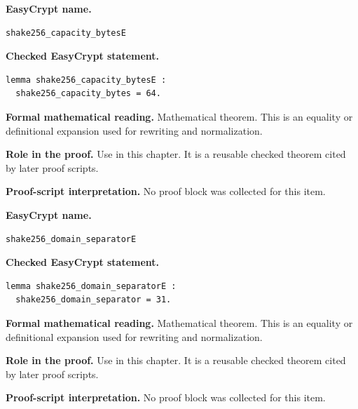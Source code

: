 \begin{formaltheorem}
\noindent\textbf{EasyCrypt name.}
\begin{lstlisting}[language=EasyCrypt,basicstyle=\ttfamily\scriptsize]
shake256_capacity_bytesE
\end{lstlisting}
\noindent\textbf{Checked EasyCrypt statement.}
\begin{lstlisting}[language=EasyCrypt,basicstyle=\ttfamily\scriptsize]
lemma shake256_capacity_bytesE :
  shake256_capacity_bytes = 64.
\end{lstlisting}
\noindent\textbf{Formal mathematical reading.}
Mathematical theorem. This is an equality or definitional expansion used for rewriting and normalization.

\noindent\textbf{Role in the proof.}
Use in this chapter. It is a reusable checked theorem cited by later proof scripts.

\noindent\textbf{Proof-script interpretation.}
No proof block was collected for this item.

\end{formaltheorem}

\begin{formaltheorem}
\noindent\textbf{EasyCrypt name.}
\begin{lstlisting}[language=EasyCrypt,basicstyle=\ttfamily\scriptsize]
shake256_domain_separatorE
\end{lstlisting}
\noindent\textbf{Checked EasyCrypt statement.}
\begin{lstlisting}[language=EasyCrypt,basicstyle=\ttfamily\scriptsize]
lemma shake256_domain_separatorE :
  shake256_domain_separator = 31.
\end{lstlisting}
\noindent\textbf{Formal mathematical reading.}
Mathematical theorem. This is an equality or definitional expansion used for rewriting and normalization.

\noindent\textbf{Role in the proof.}
Use in this chapter. It is a reusable checked theorem cited by later proof scripts.

\noindent\textbf{Proof-script interpretation.}
No proof block was collected for this item.

\end{formaltheorem}

